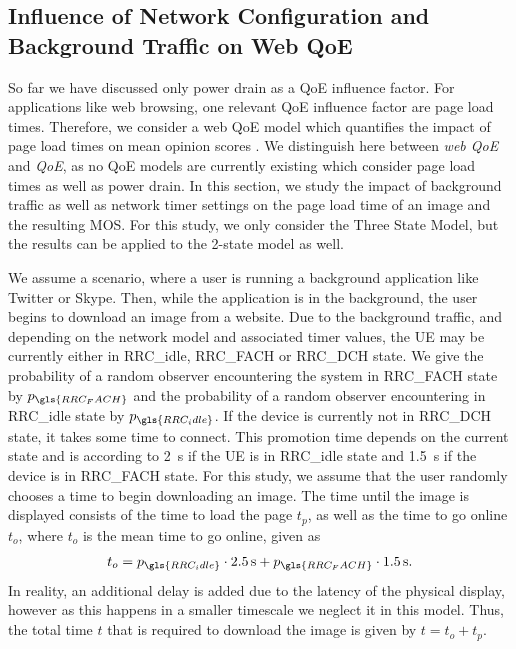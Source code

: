 \subsection{Influence of Network Configuration and Background Traffic on Web QoE}\label{sec:network:network_traces:numerical_results:web_qoe}
So far we have discussed only power drain as a \gls{QoE} influence factor.
For applications like web browsing, one relevant QoE influence factor are page load times.
Therefore, we consider a web QoE model which quantifies the impact of page load times on mean opinion scores \cite{egger2012a}.
We distinguish here between \emph{web \gls{QoE}} and \emph{\gls{QoE}}, as no \gls{QoE} models are currently existing which consider page load times as well as power drain.
In this section, we study the impact of background traffic as well as network timer settings on the page load time of an image and the resulting \gls{MOS}.
For this study, we only consider the Three State Model, but the results can be applied to the 2-state model as well.

We assume a scenario, where a user is running a background application like Twitter or Skype.
Then, while the application is in the background, the user begins to download an image from a website.
Due to the background traffic, and depending on the network model and associated timer values, the \gls{UE} may be currently either in \gls{RRC_idle}, \gls{RRC_FACH} or \gls{RRC_DCH} state.
We give the probability of a random observer encountering the system in \gls{RRC_FACH} state by \(p_{\gls{RRC_FACH}}\) and the probability of a random observer encountering in \gls{RRC_idle} state by $p_{\gls{RRC_idle}}$.
If the device is currently not in \gls{RRC_DCH} state, it takes some time to connect.
This promotion time depends on the current state and is according to \cite{Qian2010b} \SI{2}{\second} if the \gls{UE} is in \gls{RRC_idle} state and \SI{1.5}{\second} if the device is in \gls{RRC_FACH} state.
For this study, we assume that the user randomly chooses a time to begin downloading an image.
The time until the image is displayed consists of the time to load the page \(t_p\), as well as the time to go online \(t_o\), where \(t_o\) is the mean time to go online, given as 
\[t_o = p_{\gls{RRC_idle}} \cdot \SI{2.5}{\second} + p_{\gls{RRC_FACH}} \cdot \SI{1.5}{\second}.\]
In reality, an additional delay is added due to the latency of the physical display, however as this happens in a smaller timescale we neglect it in this model.
Thus, the total time \(t\) that is required to download the image is given by \(t = t_o + t_p\).

